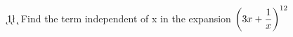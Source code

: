 
%
%
%
%      
% 
% 
%   


\DIVIDE{}\k 
\ADD\k{1}\l
\SUBTRACT\vbthree\k\m
\question[4] Find the term independent of x in the expansion $\left({3 x + \dfrac{1}{x}}\right)^{12}$

